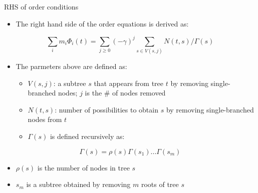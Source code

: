 \documentclass[serif]{beamer}
\begin{document}
\begin{frame}{RHS of order conditions}
  \begin{itemize}
  \item<1-> The right hand side of the order equations is derived as:
  \end{itemize}
  \begin{equation}
    \nonumber
    \sum_im_i\Phi_i\left(t\right) = \sum_{j \geq 0} \left(-\gamma\right)^j\sum_{s\in V\left(s,j\right)} N\left(t,s\right)/\Gamma\left(s\right)
  \end{equation}
  \begin{itemize}
  \item<1-> The parmeters above are defined as:
    \begin{itemize}
    \item<1-> $V\left(s,j\right)$: a subtree $s$ that appears from tree $t$ by removing single-branched nodes; $j$ is the \# of nodes removed
    \item<1-> $N\left(t,s\right)$: number of possibilities to obtain $s$ by removing single-branched nodes from $t$
    \item <1-> $\Gamma\left(s\right)$ is defined recursively as:
    \end{itemize}
  \end{itemize}
  \begin{equation}
    \nonumber
    \Gamma\left(s\right) = \rho\left(s\right)\Gamma\left(s_1\right)...\Gamma\left(s_m\right)
  \end{equation}
  \begin{itemize}
  \item<1-> $\rho\left(s\right)$ is the number of nodes in tree $s$
  \item<1-> $s_m$ is a subtree obtained by removing $m$ roots of tree $s$
  \end{itemize}
\end{frame}
\end{document}
